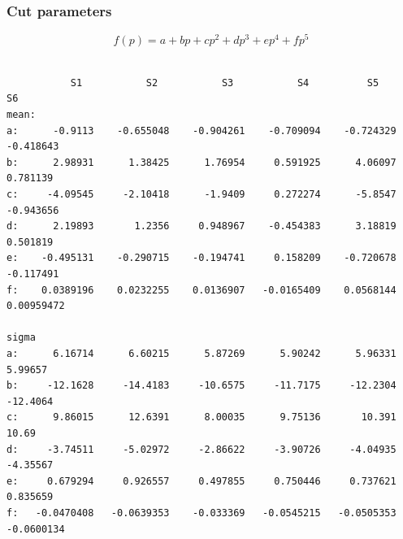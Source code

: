 \subsubsection{Cut parameters}\label{sec:dtp_parameters}
$$
f(p) = a + bp + cp^2 + dp^3 + ep^4 + fp^5
$$
\begin{verbatim}

           S1           S2           S3           S4          S5            S6
mean:
a:      -0.9113    -0.655048    -0.904261    -0.709094    -0.724329    -0.418643
b:      2.98931      1.38425      1.76954     0.591925      4.06097     0.781139
c:     -4.09545     -2.10418      -1.9409     0.272274      -5.8547    -0.943656
d:      2.19893       1.2356     0.948967    -0.454383      3.18819     0.501819
e:    -0.495131    -0.290715    -0.194741     0.158209    -0.720678    -0.117491
f:    0.0389196    0.0232255    0.0136907   -0.0165409    0.0568144   0.00959472

sigma 
a:      6.16714      6.60215      5.87269      5.90242      5.96331      5.99657
b:     -12.1628     -14.4183     -10.6575     -11.7175     -12.2304     -12.4064
c:      9.86015      12.6391      8.00035      9.75136       10.391        10.69
d:     -3.74511     -5.02972     -2.86622     -3.90726     -4.04935     -4.35567
e:     0.679294     0.926557     0.497855     0.750446     0.737621     0.835659
f:   -0.0470408   -0.0639353    -0.033369   -0.0545215   -0.0505353   -0.0600134

\end{verbatim}

\clearpage

